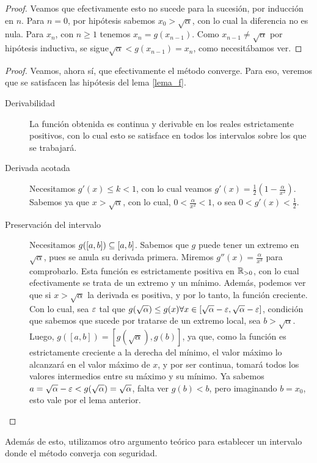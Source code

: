 \begin{prop} 
\begin{lema}
\begin{proof}
 Veamos que efectivamente esto no sucede para la sucesión, por inducción en $n$. Para $n = 0$, por hipótesis sabemos $x_0 > \sqrt{\alpha}$, con lo cual la diferencia no es nula. Para $x_n$, con $n\geq 1$ tenemos $x_n = g(x_{n-1})$. Como $x_{n-1}\neq \sqrt{\alpha}$ por hipótesis inductiva, se sigue$  \sqrt{\alpha} < g(x_{n-1}) = x_n$, como necesitábamos ver.
\end{proof}
\end{lema}
\begin{proof}
Veamos, ahora sí, que efectivamente el método converge. Para eso, veremos que se satisfacen las hipótesis del lema \ref{lema_f}.
\begin{description}
	\item[Derivabilidad] La función obtenida es continua y derivable en los reales estrictamente positivos, con lo cual esto se satisface en todos los intervalos sobre los que se trabajará.
	\item[Derivada acotada]  Necesitamos $g'(x) \leq k < 1$, con lo cual veamos $g'(x) = \frac{1}{2} (1- \frac{\alpha}{x^2})$. Sabemos ya que $x > \sqrt{\alpha}$, con lo cual, $ 0<\frac{\alpha}{x^2} < 1$, o sea $0 < g'(x) < \frac{1}{2}$.
	\item[Preservación del intervalo] Necesitamos $g([a,b]) \subseteq [a,b]$. Sabemos que $g$ puede tener un extremo en $\sqrt{\alpha}$, pues se anula su derivada primera. Miremos $g''(x) = \frac{\alpha}{x^3}$ para comprobarlo. Esta función es estrictamente positiva en $\mathbb{R}_{>0}$, con lo cual efectivamente se trata de un extremo y un mínimo. Además, podemos ver que si $x > \sqrt{\alpha}$ la derivada es positiva, y por lo tanto, la función creciente. Con lo cual, sea $\varepsilon$  tal que $g(\sqrt{\alpha}) \leq g(x) \forall x\in [\sqrt{\alpha}-\varepsilon, \sqrt{\alpha}-\varepsilon]$, condición que sabemos que sucede por tratarse de un extremo local, sea $b > \sqrt{\alpha}$. Luego, $g([a,b]) = [g(\sqrt{\alpha}), g(b)]$, ya que, como la función es estrictamente creciente a la derecha del mínimo, el valor máximo lo alcanzará en el valor máximo de $x$, y por ser continua, tomará todos los valores intermedios entre su máximo y su mínimo. Ya sabemos $a = \sqrt{\alpha} -\varepsilon < g(\sqrt{\alpha}) = \sqrt{\alpha}$, falta ver $g(b) < b$, pero imaginando $b = x_0$, esto vale por el lema anterior.
	
\end{description}
\end{proof}

\end{prop}
Además de esto, utilizamos otro argumento teórico para establecer un intervalo donde el método converja con seguridad. 
